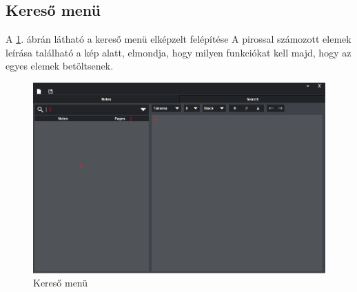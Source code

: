 \subsection{Kereső menü}

A \ref{fig:menu_search}. ábrán látható a kereső menü elképzelt felépítése A pirossal számozott elemek leírása található a kép alatt, elmondja, hogy milyen funkciókat kell majd, hogy az egyes elemek betöltsenek.

\begin{figure}[h]
	\centering
	\includegraphics[scale=0.5]{images/menu_3.png}
	\caption{Kereső menü}
	\label{fig:menu_search}
\end{figure}

